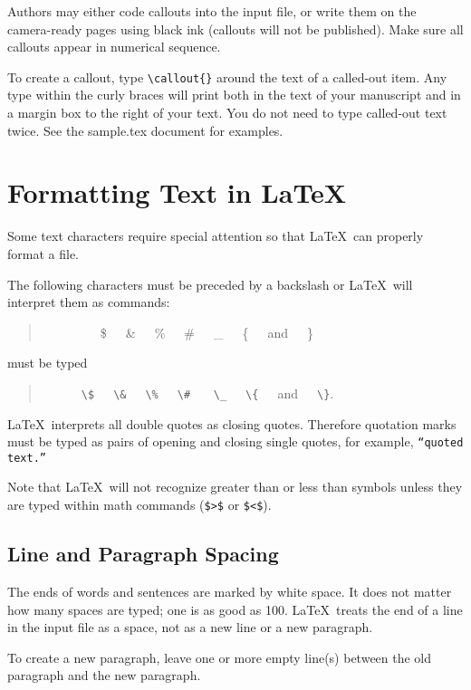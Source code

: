 \begin{article}
Authors may either code callouts into the input file, 
or write them on the camera-ready pages using black ink 
(callouts will not be published).  Make sure all callouts 
appear in numerical sequence.

To create a callout, type \verb"\callout{}" around 
the text of a called-out item.  Any type within the 
curly braces will print both in the text of your 
manuscript and in a margin box to the right of your 
text.  You do not need to type called-out text twice.
See the sample.tex document for examples.


\section{Formatting Text in \LaTeX}\label{formtext}

Some text characters require special attention 
so that \LaTeX\ can properly format a file.

The following characters must be preceded by a 
backslash or \LaTeX\ will interpret them as commands:
\begin{quote}
~~~~~~~~~\$~~~\&~~~\%~~~\#~~~\_~~~\{~~~and~~~\}
\end{quote}
must be typed
\begin{center}
\begin{quote}
~~~~~~\verb"\$"~~~\verb"\&"~~~\verb"\%"~~~\verb"\#"
~~~\verb"\_"~~~\verb"\{"~~~and~~~\verb"\}".
\end{quote}
\end{center}

\LaTeX\ interprets all double quotes as closing quotes.
Therefore quotation marks must be typed as pairs of 
opening and closing single quotes, for example, 
{\tt ``quoted text.''}

Note that \LaTeX\ will not recognize greater than or
less than symbols unless they are typed within math
commands (\verb"$>$" or \verb"$<$").


\subsection{Line and Paragraph Spacing}

The ends of words and sentences are marked by white 
space.  It does not matter how many spaces are typed; 
one is as good as 100.  \LaTeX\ treats the end of a 
line in the input file as a space, not as a new line
or a new paragraph.

To create a new paragraph, leave one or more empty 
line(s) between the old paragraph and the new paragraph.



\end{article}

